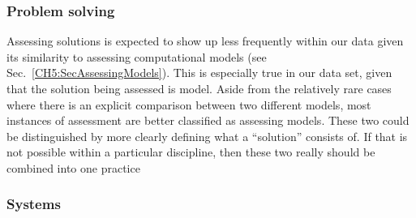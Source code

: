 \documentclass{msuphddissertation}
\begin{document}
\begin{doublespace}


\subsubsection{Problem solving}


Assessing solutions is expected to show up less frequently within our data given its similarity to assessing computational models (see Sec.~\ref{CH5:SecAssessingModels}).  This is especially true in our data set, given that the solution being assessed is model.  Aside from the relatively rare cases where there is an explicit comparison between two different models, most instances of assessment are better classified as assessing models.  These two could be distinguished by more clearly defining what a ``solution'' consists of.  If that is not possible within a particular discipline, then these two really should be combined into one practice

\subsubsection{Systems}



\end{doublespace}
\end{document}
